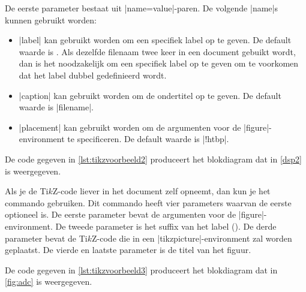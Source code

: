 De eerste parameter bestaat uit |name=value|-paren.
De volgende |name|s kunnen gebruikt worden:
\begin{itemize}
	\item |label| kan gebruikt worden om een specifiek label op te geven. De default waarde is {\lstllabel{}}. 
	Als dezelfde filenaam twee keer in een document gebuikt wordt, dan is het noodzakelijk om een specifiek label op te geven om te voorkomen dat het label {\lstllabel{}} dubbel gedefinieerd wordt.
	\item |caption| kan gebruikt worden om de ondertitel op te geven. De default waarde is |filename|.  
	\item |placement| kan gebruikt worden om de  argumenten voor de |figure|-environment te specificeren.
	De default waarde is |!htbp|.
\end{itemize} 

De code gegeven in \cref{lst:tikzvoorbeeld2} produceert het blokdiagram dat in \cref{dsp2} is weergegeven.



Als je de Ti$k$Z-code liever in het document zelf opneemt, dan kun je het commando {\lstlcs{}} gebruiken.
Dit commando heeft vier parameters waarvan de eerste optioneel is.
De eerste parameter bevat de  argumenten voor de |figure|-environment.
De tweede parameter is het suffix van het label ({\lstllabel{}}).
De derde parameter bevat de Ti$k$Z-code die in een |tikzpicture|-environment zal worden geplaatst. 
De vierde en laatste parameter is de titel van het figuur.

De code gegeven in \cref{lst:tikzvoorbeeld3} produceert het blokdiagram dat in \cref{fig:adc} is weergegeven.


